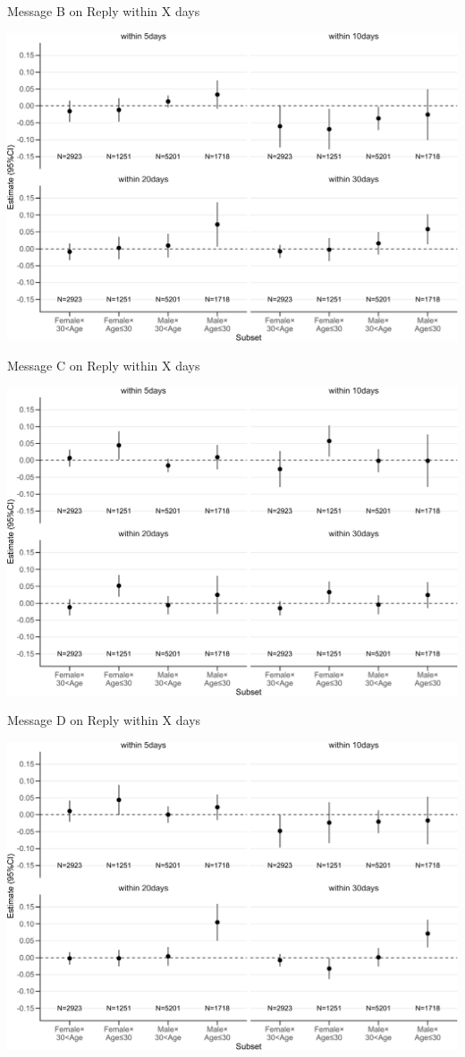 \documentclass[
      aspectratio=169,
        12pt,
    ]{beamer}
\begin{document}
\begin{frame}{Message B on Reply within X days}
\protect\hypertarget{message-b-on-reply-within-x-days}{}
\begin{center}\includegraphics[width=0.75\linewidth]{report_files/figure-beamer/plotB-hetero-gender-age-secondary-1} \end{center}
\end{frame}

\begin{frame}{Message C on Reply within X days}
\protect\hypertarget{message-c-on-reply-within-x-days}{}
\begin{center}\includegraphics[width=0.75\linewidth]{report_files/figure-beamer/plotC-hetero-gender-age-secondary-1} \end{center}
\end{frame}

\begin{frame}{Message D on Reply within X days}
\protect\hypertarget{message-d-on-reply-within-x-days}{}
\begin{center}\includegraphics[width=0.75\linewidth]{report_files/figure-beamer/plotD-hetero-gender-age-secondary-1} \end{center}
\end{frame}
\end{document}
